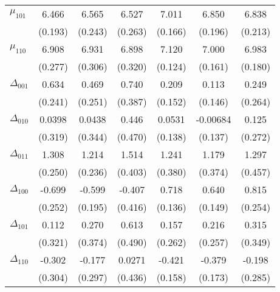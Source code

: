 \begin{table}[hbtp]
{\begin{tabular}{l*{6}{c}}
    $\mu_{101}$&    6.466\sym{***}&    6.565\sym{***}&    6.527\sym{***}&    7.011\sym{***}&    6.850\sym{***}&    6.838\sym{***}\\
              &  (0.193)         &  (0.243)         &  (0.263)         &  (0.166)         &  (0.196)         &  (0.213)         \\
    $\mu_{110}$&    6.908\sym{***}&    6.931\sym{***}&    6.898\sym{***}&    7.120\sym{***}&    7.000\sym{***}&    6.983\sym{***}\\
              &  (0.277)         &  (0.306)         &  (0.320)         &  (0.124)         &  (0.161)         &  (0.180)         \\
    $\Delta_{001}$&    0.634\sym{***}&    0.469\sym{*}  &    0.740\sym{*}  &    0.209         &    0.113         &    0.249         \\
              &  (0.241)         &  (0.251)         &  (0.387)         &  (0.152)         &  (0.146)         &  (0.264)         \\
    $\Delta_{010}$&   0.0398         &   0.0438         &    0.446         &   0.0531         & -0.00684         &    0.125         \\
              &  (0.319)         &  (0.344)         &  (0.470)         &  (0.138)         &  (0.137)         &  (0.272)         \\
    $\Delta_{011}$&    1.308\sym{***}&    1.214\sym{***}&    1.514\sym{***}&    1.241\sym{***}&    1.179\sym{***}&    1.297\sym{***}\\
              &  (0.250)         &  (0.236)         &  (0.403)         &  (0.380)         &  (0.374)         &  (0.457)         \\
    $\Delta_{100}$&   -0.699\sym{***}&   -0.599\sym{***}&   -0.407         &    0.718\sym{***}&    0.640\sym{***}&    0.815\sym{***}\\
              &  (0.252)         &  (0.195)         &  (0.416)         &  (0.136)         &  (0.149)         &  (0.254)         \\
    $\Delta_{101}$&    0.112         &    0.270         &    0.613         &    0.157         &    0.216         &    0.315         \\
              &  (0.321)         &  (0.374)         &  (0.490)         &  (0.262)         &  (0.257)         &  (0.349)         \\
    $\Delta_{110}$&   -0.302         &   -0.177         &   0.0271         &   -0.421\sym{***}&   -0.379\sym{**} &   -0.198         \\
              &  (0.304)         &  (0.297)         &  (0.436)         &  (0.158)         &  (0.173)         &  (0.285)         \\

\end{tabular}}
\end{table}
